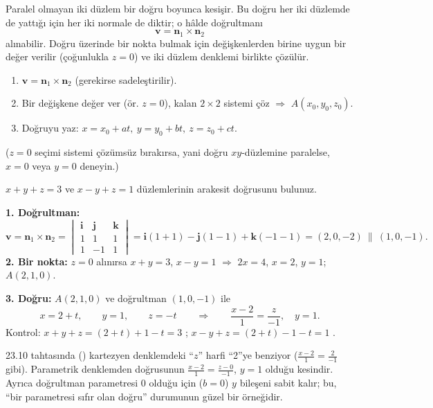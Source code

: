 Paralel olmayan iki düzlem bir doğru boyunca kesişir. Bu doğru her iki düzlemde de yattığı için her iki normale de diktir; o hâlde doğrultmanı
\[ \mathbf v=\mathbf n_1\times\mathbf n_2 \]
alınabilir. Doğru üzerinde bir nokta bulmak için değişkenlerden birine uygun bir değer verilir (çoğunlukla $z=0$) ve iki düzlem denklemi birlikte çözülür.

\begin{teorem}
\begin{enumerate}
  \item $\mathbf v=\mathbf n_1\times\mathbf n_2$ (gerekirse sadeleştirilir).
  \item Bir değişkene değer ver (ör. $z=0$), kalan $2\times2$ sistemi çöz $\Rightarrow$ $A(x_0,y_0,z_0)$.
  \item Doğruyu yaz: $x=x_0+at,\ y=y_0+bt,\ z=z_0+ct$.
\end{enumerate}
($z=0$ seçimi sistemi çözümsüz bırakırsa, yani doğru $xy$-düzlemine paralelse, $x=0$ veya $y=0$ deneyin.)
\end{teorem}

\begin{soru}
$x+y+z=3$ ve $x-y+z=1$ düzlemlerinin arakesit doğrusunu bulunuz.
\end{soru}
\begin{cevap}
\textbf{1. Doğrultman:}
\[ \mathbf v=\mathbf n_1\times\mathbf n_2=\begin{vmatrix}\mathbf i&\mathbf j&\mathbf k\\1&1&1\\1&-1&1\end{vmatrix}
=\mathbf i(1+1)-\mathbf j(1-1)+\mathbf k(-1-1)=(2,0,-2)\ \parallel\ (1,0,-1). \]
\textbf{2. Bir nokta:} $z=0$ alınırsa $x+y=3$, $x-y=1$ $\Rightarrow$ $2x=4$, $x=2$, $y=1$; $A(2,1,0)$.

\textbf{3. Doğru:} $A(2,1,0)$ ve doğrultman $(1,0,-1)$ ile
\[ x=2+t,\qquad y=1,\qquad z=-t\qquad\Longrightarrow\qquad \boxed{\frac{x-2}{1}=\frac{z}{-1},\quad y=1}. \]
Kontrol: $x+y+z=(2+t)+1-t=3$ \checkmark; $x-y+z=(2+t)-1-t=1$ \checkmark.
\end{cevap}
\begin{bilgi}
23.10 tahtasında () kartezyen denklemdeki ``$z$'' harfi ``2''ye benziyor ($\frac{x-2}{1}=\frac{2}{-1}$ gibi). Parametrik denklemden doğrusunun $\frac{x-2}{1}=\frac{z-0}{-1}$, $y=1$ olduğu kesindir. Ayrıca doğrultman parametresi $0$ olduğu için ($b=0$) $y$ bileşeni sabit kalır; bu, ``bir parametresi sıfır olan doğru'' durumunun güzel bir örneğidir.
\end{bilgi}

